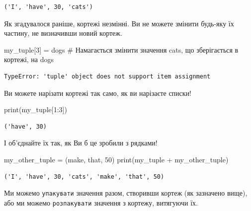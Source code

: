 \documentclass[
  letterpaper,
]{report}
\newenvironment{Shaded}{\begin{snugshade}}{\end{snugshade}}
\newcommand{\BuiltInTok}[1]{\textcolor[rgb]{0.00,0.23,0.31}{#1}}
\newcommand{\CommentTok}[1]{\textcolor[rgb]{0.37,0.37,0.37}{#1}}
\newcommand{\DecValTok}[1]{\textcolor[rgb]{0.68,0.00,0.00}{#1}}
\newcommand{\NormalTok}[1]{\textcolor[rgb]{0.00,0.23,0.31}{#1}}
\newcommand{\OperatorTok}[1]{\textcolor[rgb]{0.37,0.37,0.37}{#1}}
\newcommand{\StringTok}[1]{\textcolor[rgb]{0.13,0.47,0.30}{#1}}
\begin{document}
\begin{verbatim}
('I', 'have', 30, 'cats')
\end{verbatim}

Як згадувалося раніше, кортежі незмінні. Ви не можете змінити будь-яку
їх частину, не визначивши новий кортеж.

\begin{Shaded}
\begin{Highlighting}[]
\NormalTok{my\_tuple[}\DecValTok{3}\NormalTok{] }\OperatorTok{=} \StringTok{\textquotesingle{}dogs\textquotesingle{}} \CommentTok{\# Намагається змінити значення \textquotesingle{}cats\textquotesingle{}, що зберігається в кортежі, на \textquotesingle{}dogs\textquotesingle{}}
\end{Highlighting}
\end{Shaded}

\begin{verbatim}
TypeError: 'tuple' object does not support item assignment
\end{verbatim}

Ви можете нарізати кортежі так само, як ви нарізаєте списки!

\begin{Shaded}
\begin{Highlighting}[]
\BuiltInTok{print}\NormalTok{(my\_tuple[}\DecValTok{1}\NormalTok{:}\DecValTok{3}\NormalTok{])}
\end{Highlighting}
\end{Shaded}

\begin{verbatim}
('have', 30)
\end{verbatim}

І об'єднайте їх так, як Ви б це зробили з рядками!

\begin{Shaded}
\begin{Highlighting}[]
\NormalTok{my\_other\_tuple }\OperatorTok{=}\NormalTok{ (}\StringTok{\textquotesingle{}make\textquotesingle{}}\NormalTok{, }\StringTok{\textquotesingle{}that\textquotesingle{}}\NormalTok{, }\DecValTok{50}\NormalTok{)}
\BuiltInTok{print}\NormalTok{(my\_tuple }\OperatorTok{+}\NormalTok{ my\_other\_tuple)}
\end{Highlighting}
\end{Shaded}

\begin{verbatim}
('I', 'have', 30, 'cats', 'make', 'that', 50)
\end{verbatim}

Ми можемо \texttt{упакувати} значення разом, створивши кортеж (як
зазначено вище), або ми можемо \texttt{розпакувати} значення з кортежу,
витягуючи їх.
\end{document}
